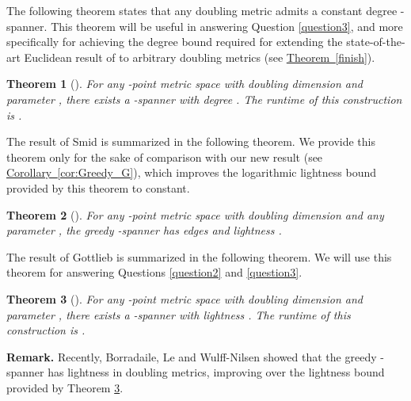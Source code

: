 \documentclass[11pt,letterpaper]{article}
\newtheorem{theorem}{Theorem}
\newcommand{\namedref}[2]{\hyperref[#2]{#1~\ref*{#2}}}
\newcommand{\theoremref}[1]{\namedref{Theorem}{#1}}
\newcommand{\corollaryref}[1]{\namedref{Corollary}{#1}}
\begin{document}
The following theorem states that any doubling metric admits a constant degree -spanner. This theorem will be useful in answering Question \ref{question3}, and more specifically for achieving the degree bound required for extending the state-of-the-art Euclidean result of \cite{GLN02} to arbitrary doubling metrics (see \theoremref{finish}).


\begin{theorem}[\cite{CGMZ16,GR08}]\label{thm:doubling_degree}
	For any -point metric  space  with doubling dimension
	 and parameter , there exists a -spanner with degree .
	The runtime of this construction is .
\end{theorem}


The result of Smid \cite{Smid09} is summarized in the following theorem. We provide this theorem only for the sake of comparison with our new result (see \corollaryref{cor:Greedy_G}),
which improves the logarithmic lightness bound provided by this theorem to constant.
\begin{theorem}[\cite{Smid09}]\label{thm:smid09}
	For any -point metric space  with doubling dimension  and any parameter ,  the greedy -spanner has
	  edges and lightness .
\end{theorem}

The result of Gottlieb \cite{Got15} is summarized in the following theorem. We will use this theorem for answering Questions \ref{question2} and \ref{question3}.
\begin{theorem}[\cite{Got15}]\label{thm:Got15}
	For any -point metric space  with doubling dimension  and parameter ,
	there exists a -spanner  with lightness .
	The runtime of this construction is .
\end{theorem}
{\bf Remark.} Recently, Borradaile, Le and Wulff{-}Nilsen \cite{BLW19} showed that the greedy -spanner has lightness   
in doubling metrics, improving over the lightness bound provided by Theorem \ref{thm:Got15}. 
\end{document}
